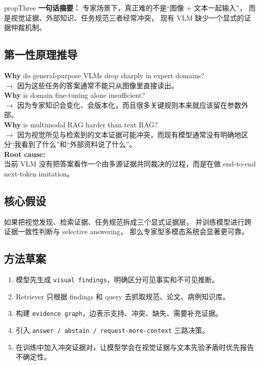 \documentclass[12pt,a4paper]{article}
\begin{document}
\begin{proposalbox}{propThree}
\textbf{一句话摘要：}
专家场景下，真正难的不是``图像 + 文本一起输入''，
而是视觉证据、外部知识、任务规范三者经常冲突，
现有 VLM 缺少一个显式的证据仲裁机制。
\end{proposalbox}

\subsection{第一性原理推导}

\begin{whybox}
\textbf{Why} do general-purpose VLMs drop sharply in expert domains?\\
$\rightarrow$ 因为这些任务的答案通常不能只从图像里直接读出。\\[3pt]
\textbf{Why} is domain fine-tuning alone insufficient?\\
$\rightarrow$ 因为专家知识会变化、会版本化，而且很多关键规则本来就应该留在参数外部。\\[3pt]
\textbf{Why} is multimodal RAG harder than text RAG?\\
$\rightarrow$ 因为视觉所见与检索到的文本证据可能冲突，而现有模型通常没有明确地区分``我看到了什么''和``外部资料说了什么''。\\[3pt]
\textbf{Root cause:}\\
当前 VLM 没有把答案看作一个由多源证据共同裁决的过程，而是在做 end-to-end next-token imitation。
\end{whybox}

\subsection{核心假设}

如果把视觉发现、检索证据、任务规范拆成三个显式证据层，
并训练模型进行跨证据一致性判断与 selective answering，
那么专家型多模态系统会显著更可靠。

\subsection{方法草案}

\begin{enumerate}[leftmargin=2em]
  \item 模型先生成 \texttt{visual findings}，明确区分可见事实和不可见推断。
  \item Retriever 只根据 findings 和 query 去抓取规范、论文、病例知识库。
  \item 构建 \texttt{evidence graph}，边表示支持、冲突、缺失、需要补充证据。
  \item 引入 \texttt{answer / abstain / request-more-context} 三路决策。
  \item 在训练中加入冲突证据对，让模型学会在视觉证据与文本先验矛盾时优先报告不确定性。
\end{enumerate}
\end{document}
